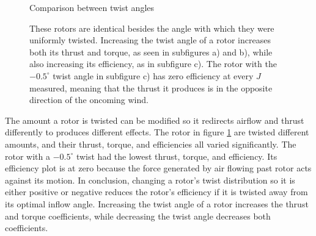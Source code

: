 \documentclass{article}
\begin{document}
\begin{figure}
  \centering
  \caption{Comparison between twist angles}
  \captionsetup{aboveskip=0pt,font=it}
  \caption*{These rotors are identical besides the angle with which they were uniformly twisted. Increasing the twist angle of a rotor increases both its thrust and torque, as seen in subfigures a) and b), while also increasing its efficiency, as in subfigure c). The rotor with the $-0.5^{\circ}$ twist angle in subfigure c) has zero efficiency at every $J$ measured, meaning that the thrust it produces is in the opposite direction of the oncoming wind.}
  \label{fig:6}
\end{figure}

The amount a rotor is twisted can be modified so it redirects airflow and thrust differently to produces different effects. The rotor in figure \ref{fig:6} are twisted different amounts, and their thrust, torque, and efficiencies all varied significantly. The rotor with a $-0.5^{\circ}$ twist had the lowest thrust, torque, and efficiency. Its efficiency plot is at zero because the force generated by air flowing past rotor acts against its motion. In conclusion, changing a rotor's twist distribution so it is either positive or negative reduces the rotor's efficiency if it is twisted away from its optimal inflow angle. Increasing the twist angle of a rotor increases the thrust and torque coefficients, while decreasing the twist angle decreases both coefficients. \newline
\end{document}
